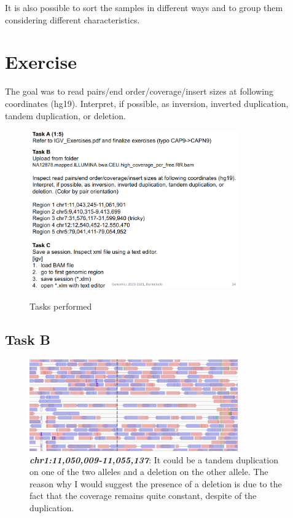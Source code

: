 It is also possible to sort the samples in different ways and to group them
considering different characteristics.



\section{Exercise}

The goal was to read pairs/end order/coverage/insert sizes at following
coordinates (hg19). Interpret, if possible, as inversion, inverted duplication,
tandem duplication, or deletion.

\begin{figure}[H]
  \caption{Tasks performed}
  \centering
  \includegraphics[width=0.8\textwidth]{TasksClass.PNG}
  \label{fig: Tasks performed IGV}
\end{figure}

\subsection{Task B}

\begin{figure}[H]
    \caption{\textit{\textbf{chr1:11,050,009-11,055,137}}: It could be a tandem
    duplication on one of the two alleles and a deletion on the other allele.
    The reason why I would suggest the presence of a deletion is due to the fact
    that the coverage remains quite constant, despite of the duplication.}
    \centering
    \includegraphics[width=0.8\textwidth]{pos1.PNG}
\end{figure}

